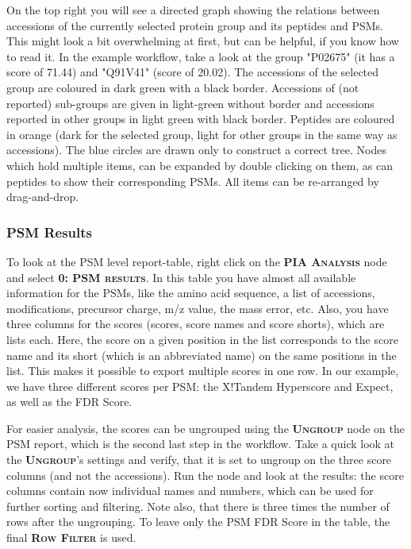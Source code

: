 \documentclass[a4paper,11pt,twoside]{article}
\newcommand{\menu}[1]{{\scshape\bfseries #1}}
\newcommand{\knimenode}[1]{{\scshape\bfseries #1}}
\begin{document}
On the top right you will see a directed graph showing the relations between
accessions of the currently selected protein group and its peptides and PSMs.
This might look a bit overwhelming at first, but can be helpful, if you know
how to read it. In the example workflow, take a look at the group "P02675" (it
has a score of 71.44) and "Q91V41" (score of 20.02). The accessions of the
selected group are coloured in dark green with a black border. Accessions of
(not reported) sub-groups are given in light-green without border and accessions
reported in other groups in light green with black border. Peptides are coloured
in orange (dark for the selected group, light for other groups in the same way
as accessions). The blue circles are drawn only to construct a correct tree.
Nodes which hold multiple items, can be expanded by double clicking on them, as
can peptides to show their corresponding PSMs. All items can be re-arranged by
drag-and-drop.


\subsubsection{PSM Results}

To look at the PSM level report-table, right click on the \knimenode{PIA
Analysis} node and select \menu{0: PSM results}. In this table you have almost
all available information for the PSMs, like the amino acid sequence, a list of
accessions, modifications, precursor charge, m/z value, the mass error, etc.
Also, you have three columns for the scores (scores, score names and score
shorts), which are lists each. Here, the score on a given position in the list
corresponds to the score name and its short (which is an abbreviated name) on
the same positions in the list. This makes it possible to export multiple scores
in one row. In our example, we have three different scores per PSM: the
X!Tandem Hyperscore and Expect, as well as the FDR Score.

For easier analysis, the scores can be ungrouped using the \knimenode{Ungroup}
node on the PSM report, which is the second last step in the workflow. Take a
quick look at the \knimenode{Ungroup}'s settings and verify, that it is set to
ungroup on the three score columns (and not the accessions). Run the node and
look at the results: the score columns contain now individual names and
numbers, which can be used for further sorting and filtering. Note also, that
there is three times the number of rows after the ungrouping. To leave only the
PSM FDR Score in the table, the final \knimenode{Row Filter} is used.
\end{document}
